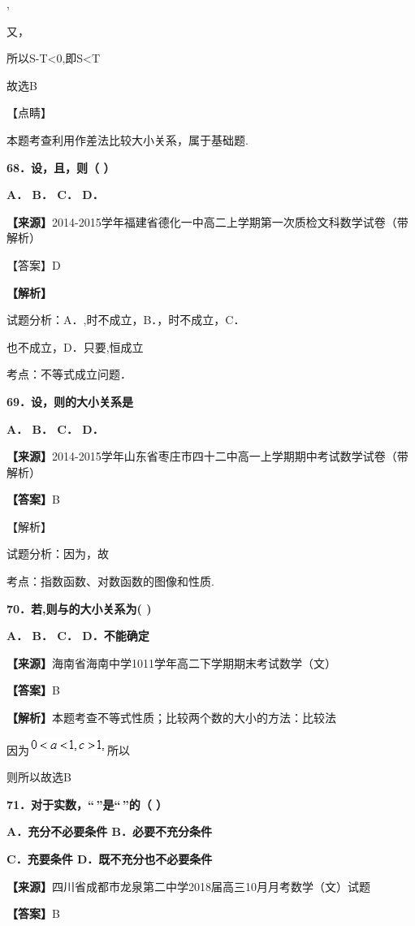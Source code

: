 \documentclass[
]{article}
\begin{document}
,

又，

所以S-T\textless0,即S\textless T

故选B

【点睛】

本题考查利用作差法比较大小关系，属于基础题.

\textbf{68．设，且，则（ ）}

\textbf{A． B． C． D．}

\textbf{【来源】}2014-2015学年福建省德化一中高二上学期第一次质检文科数学试卷（带解析）

【答案】D

\textbf{【解析】}

试题分析：A．,时不成立，B．，时不成立，C．

也不成立，D．只要,恒成立

考点：不等式成立问题．

\textbf{69．设，则的大小关系是}

\textbf{A． B． C． D．}

\textbf{【来源】}2014-2015学年山东省枣庄市四十二中高一上学期期中考试数学试卷（带解析）

\textbf{【答案】}B

【解析】

试题分析：因为，故

考点：指数函数、对数函数的图像和性质.

\textbf{70．若,则与的大小关系为( )}

\textbf{A． B． C． D．不能确定}

\textbf{【来源】}海南省海南中学1011学年高二下学期期末考试数学（文）

\textbf{【答案】}B

\textbf{【解析】}本题考查不等式性质；比较两个数的大小的方法：比较法

因为\includegraphics[width=1.00014in,height=0.21878in]{Fig//media/image728.png}所以

则所以故选B

\textbf{71．对于实数，``\,''是``\,''的（ ）}

\textbf{A．充分不必要条件 B．必要不充分条件}

\textbf{C．充要条件 D．既不充分也不必要条件}

\textbf{【来源】}四川省成都市龙泉第二中学2018届高三10月月考数学（文）试题

\textbf{【答案】}B
\end{document}
